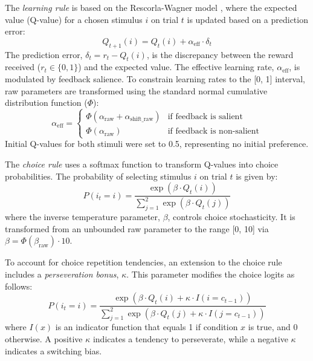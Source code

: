 The \textit{learning rule} is based on the Rescorla-Wagner model \citep{rescorla1972}, where the expected value (Q-value) for a chosen stimulus $i$ on trial $t$ is updated based on a prediction error:
\begin{equation*}
    Q_{t+1}(i) = Q_t(i) + \alpha_{\text{eff}} \cdot \delta_t
\end{equation*}
The prediction error, $\delta_t = r_t - Q_t(i)$, is the discrepancy between the reward received ($r_t \in \{0, 1\}$) and the expected value. The effective learning rate, $\alpha_{\text{eff}}$, is modulated by feedback salience. To constrain learning rates to the [0, 1] interval, raw parameters are transformed using the standard normal cumulative distribution function ($\Phi$):
\begin{equation*}
    \alpha_{\text{eff}} = 
    \begin{cases} 
        \Phi(\alpha_{\text{raw}} + \alpha_{\text{shift\_raw}}) & \text{if feedback is salient} \\
        \Phi(\alpha_{\text{raw}}) & \text{if feedback is non-salient}
    \end{cases}
\end{equation*}
Initial Q-values for both stimuli were set to 0.5, representing no initial preference.

The \textit{choice rule} uses a softmax function to transform Q-values into choice probabilities. The probability of selecting stimulus $i$ on trial $t$ is given by:
\begin{equation*}
    P(i_t = i) = \frac{\exp(\beta \cdot Q_t(i))}{\sum_{j=1}^{2} \exp(\beta \cdot Q_t(j))}
\end{equation*}
where the inverse temperature parameter, $\beta$, controls choice stochasticity. It is transformed from an unbounded raw parameter to the range [0, 10] via $\beta = \Phi(\beta_{\text{raw}}) \cdot 10$.

To account for choice repetition tendencies, an extension to the choice rule includes a \textit{perseveration bonus}, $\kappa$. This parameter modifies the choice logits as follows:
\begin{equation*}
    P(i_t = i) = \frac{\exp(\beta \cdot Q_t(i) + \kappa \cdot I(i = c_{t-1}))}{\sum_{j=1}^{2} \exp(\beta \cdot Q_t(j) + \kappa \cdot I(j = c_{t-1}))}
\end{equation*}
where $I(x)$ is an indicator function that equals 1 if condition $x$ is true, and 0 otherwise. A positive $\kappa$ indicates a tendency to perseverate, while a negative $\kappa$ indicates a switching bias.

